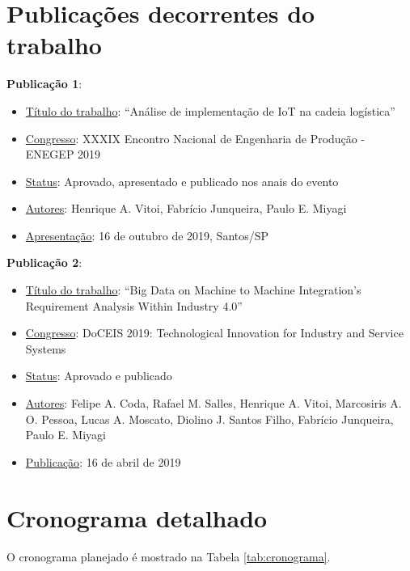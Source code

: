 \chapter{Publicações decorrentes do trabalho}

	\textbf{Publicação 1}:
	\begin{itemize}
		\item \underline{Título do trabalho}: “Análise de implementação de IoT na cadeia logística”
		\item \underline{Congresso}: XXXIX Encontro Nacional de Engenharia de Produção - ENEGEP 2019
		\item \underline{Status}: Aprovado, apresentado e publicado nos anais do evento
		\item \underline{Autores}:  Henrique A. Vitoi, Fabrício Junqueira, Paulo E. Miyagi
		\item \underline{Apresentação}: 16 de outubro de 2019, Santos/SP
	\end{itemize}
	
	\bigskip
	

	\textbf{Publicação 2}:
	\begin{itemize}
		\item \underline{Título do trabalho}: “Big Data on Machine to Machine Integration's Requirement Analysis Within Industry 4.0”
		\item \underline{Congresso}: DoCEIS 2019: Technological Innovation for Industry and Service Systems
		\item \underline{Status}: Aprovado e publicado
		\item \underline{Autores}:  Felipe A. Coda, Rafael M. Salles, Henrique A. Vitoi, Marcosiris A. O. Pessoa, Lucas A. Moscato, Diolino J. Santos Filho, Fabrício Junqueira, Paulo E. Miyagi
		\item \underline{Publicação}: 16 de abril de 2019
	\end{itemize}




\chapter{Cronograma detalhado}

	O cronograma planejado é mostrado na Tabela \ref{tab:cronograma}.
	
